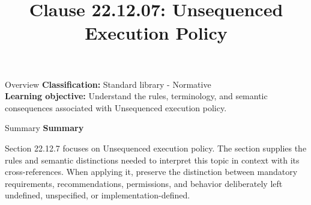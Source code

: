 \documentclass[10pt,letterpaper]{article}
\title{Clause 22.12.07: Unsequenced Execution Policy}
\author{}
\date{}
\begin{document}
\maketitle
\begin{CornellOverviewBox}{Overview}
\textbf{Classification:} Standard library - Normative\\[2pt]
\textbf{Learning objective:} Understand the rules, terminology, and semantic consequences associated with Unsequenced execution policy.
\end{CornellOverviewBox}\begin{CornellSummaryBox}{Summary}
{\sffamily\bfseries\color{Accent} Summary}\par\vspace{3pt}Section 22.12.7 focuses on Unsequenced execution policy. The section supplies the rules and semantic distinctions needed to interpret this topic in context with its cross-references. When applying it, preserve the distinction between mandatory requirements, recommendations, permissions, and behavior deliberately left undefined, unspecified, or implementation-defined.
\end{CornellSummaryBox}
\end{document}
